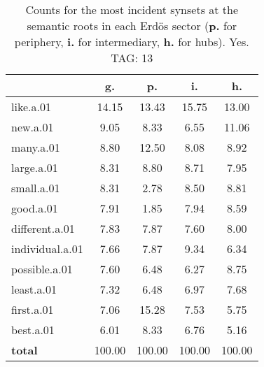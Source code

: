 \begin{table}[h!]
\begin{center}
\begin{tabular}{| l || c | c | c | c |}\hline
 & {\bf g.} & {\bf p.} & {\bf i.} & {\bf h.} \\\hline\hline
like.a.01 & 14.15  & 13.43  & 15.75  & 13.00 \\\hline
new.a.01 & 9.05  & 8.33  & 6.55  & 11.06 \\\hline
many.a.01 & 8.80  & 12.50  & 8.08  & 8.92 \\\hline
large.a.01 & 8.31  & 8.80  & 8.71  & 7.95 \\\hline
small.a.01 & 8.31  & 2.78  & 8.50  & 8.81 \\\hline
good.a.01 & 7.91  & 1.85  & 7.94  & 8.59 \\\hline
different.a.01 & 7.83  & 7.87  & 7.60  & 8.00 \\\hline
individual.a.01 & 7.66  & 7.87  & 9.34  & 6.34 \\\hline
possible.a.01 & 7.60  & 6.48  & 6.27  & 8.75 \\\hline
least.a.01 & 7.32  & 6.48  & 6.97  & 7.68 \\\hline
first.a.01 & 7.06  & 15.28  & 7.53  & 5.75 \\\hline
best.a.01 & 6.01  & 8.33  & 6.76  & 5.16 \\\hline\hline
{{\bf total}} & 100.00  & 100.00  & 100.00  & 100.00 \\\hline
\end{tabular}
\caption{Counts for the most incident synsets at the semantic roots in each Erd\"os sector ({\bf p.} for periphery, {\bf i.} for intermediary, {\bf h.} for hubs). Yes. TAG: 13}
\end{center}
\end{table}